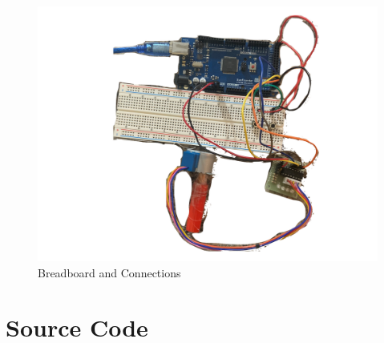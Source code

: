 \documentclass[a4paper,12pt]{article} %
\begin{document}
\begin{figure}[h!]
  \center
  \includegraphics[width=\textwidth]{ConnectionsImage.png}
  \caption{Breadboard and Connections}
\end{figure}




\clearpage
\section{Source Code} %
\vspace{5mm}
\linespread{1}

\linespread{1.6}
\vspace{5mm}
\end{document}
